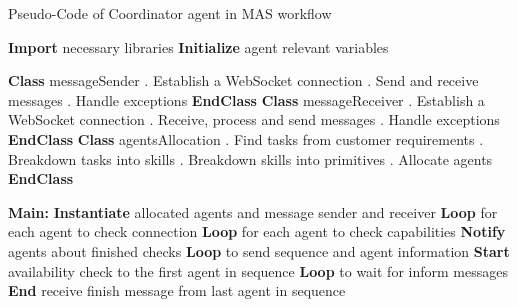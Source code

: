    
\begin{algorithm}
\caption{Pseudo-Code of Coordinator agent in MAS workflow}
\label{alg:CDAPseudoCode}
\begin{algorithmic}
\State \textbf{Import} necessary libraries
\State \textbf{Initialize} agent relevant variables

\State \textbf{Class} messageSender
    . Establish a WebSocket connection
    . Send and receive messages
    . Handle exceptions
    \EndProcedure
\State \textbf{EndClass}
\State \textbf{Class} messageReceiver
    . Establish a WebSocket connection
    . Receive, process and send messages
    . Handle exceptions
    \EndProcedure
\State \textbf{EndClass}
\State \textbf{Class} agentsAllocation
    . Find tasks from customer requirements
    . Breakdown tasks into skills
    . Breakdown skills into primitives
    . Allocate agents
    \EndProcedure
\State \textbf{EndClass}

\State \textbf{Main:}
\State \textbf{Instantiate} allocated agents and message sender and receiver
\State \textbf{Loop} for each agent to check connection
\State \textbf{Loop} for each agent to check capabilities
\State \textbf{Notify} agents about finished checks
\State \textbf{Loop} to send sequence and agent information
\State \textbf{Start} availability check to the first agent in sequence
\State \textbf{Loop} to wait for inform messages
\State \textbf{End} receive finish message from last agent in sequence 
\end{algorithmic}
\end{algorithm}

